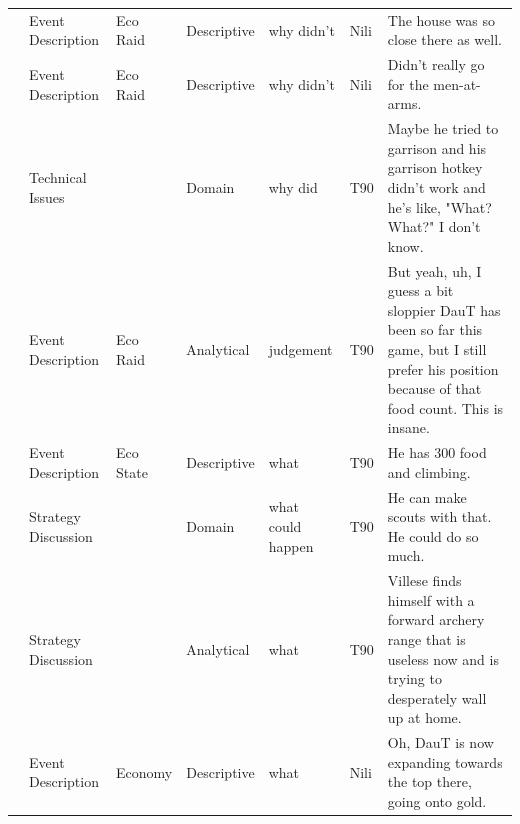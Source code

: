 {\begin{longtable}{@{}>{\theAppRow}r|L{2.3cm}L{2.2cm}L{1.4cm}L{2.2cm}L{0.5cm}U{5.6cm}@{}}
    & Event Description     & Eco Raid             & Descriptive   & why didn't        & Nili    & The house was so close there as well.                                                                                                                                                                                    \\
    & Event Description     & Eco Raid             & Descriptive   & why didn't        & Nili    & Didn't really go for the men-at-arms.                                                                                                                                                                                    \\
    & Technical Issues      &                      & Domain      & why did           & T90     & Maybe he tried to garrison and his garrison hotkey didn't work and he's like, "What? What?" I don't know.                                                                                                                \\
    & Event Description     & Eco Raid             & Analytical  & judgement         & T90     & But yeah, uh, I guess a bit sloppier DauT has been so far this game, but I still prefer his position because of that food count. This is insane.                                                                         \\
    & Event Description     & Eco State            & Descriptive   & what              & T90     & He has 300 food and climbing.                                                                                                                                                                                            \\
    & Strategy Discussion   &                      & Domain      & what could happen & T90     & He can make scouts with that. He could do so much.                                                                                                                                                                       \\
    & Strategy Discussion   &                      & Analytical  & what              & T90     & Villese finds himself with a forward archery range that is useless now and is trying to desperately wall up at home.                                                                                                      \\
    & Event Description     & Economy              & Descriptive   & what              & Nili    & Oh, DauT is now expanding towards the top there, going onto gold.                                                                                                                                                        \\

\end{longtable}}
